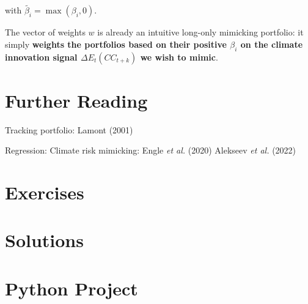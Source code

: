 with $\tilde{\beta_i} = \max(\beta_i, 0)$.

The vector of weights $w$ is already an intuitive 
long-only mimicking portfolio: it simply 
\textbf{weights the portfolios based on their positive 
$\beta_i$ on the climate innovation signal 
$\Delta E_t(CC_{t+k})$ we wish to mimic}.
 

\section{Further Reading}

Tracking portfolio: Lamont (2001) \cite{lamont2001economic}

Regression: 
Climate risk mimicking: Engle \textit{et al.} (2020) \cite{engle2020hedging}
Alekseev \textit{et al.} (2022) \cite{alekseev2022quantity}
\section{Exercises}

\section{Solutions}

\section{Python Project}